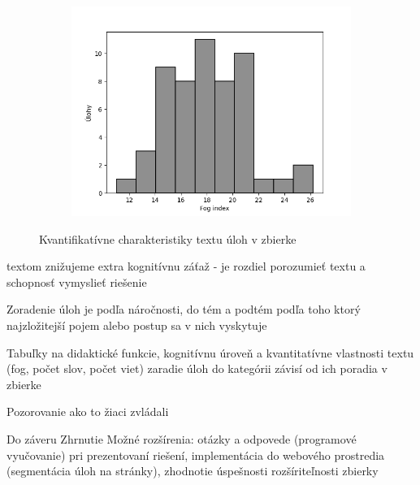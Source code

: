 \begin{figure}[h]
\begin{subfigure}[b]{0.32\textwidth}
\includegraphics[width=\textwidth]{assets/fog.png}
\end{subfigure}
\hfill
\caption{Kvantifikatívne charakteristiky textu úloh v zbierke}
\end{figure}

textom znižujeme extra kognitívnu záťaž - je rozdiel porozumieť textu a schopnosť vymyslieť riešenie

Zoradenie úloh je podľa náročnosti, do tém a podtém podľa toho ktorý najzložitejší pojem alebo postup sa v nich vyskytuje

Tabuľky na didaktické funkcie, kognitívnu úroveň a kvantitatívne vlastnosti textu (fog, počet slov, počet viet)
zaradie úloh do kategórii závisí od ich poradia v zbierke

Pozorovanie ako to žiaci zvládali

Do záveru
Zhrnutie
Možné rozšírenia: otázky a odpovede (programové vyučovanie) pri prezentovaní riešení, implementácia do webového prostredia (segmentácia úloh na stránky), zhodnotie úspešnosti rozšíriteľnosti zbierky


